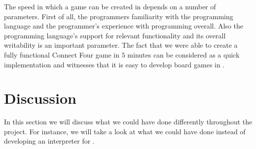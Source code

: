 The speed in which a game can be created in \productname{} depends on a number
of parameters. First of all, the programmers familiarity with the programming
language and the programmer's experience with programming overall. Also the
programming language's support for relevant functionality and its overall
writability is an important parameter. The fact that we were able to create a
fully functional Connect Four game in $5$ minutes can be considered as a quick
implementation and witnesses that it is easy to develop board games in
\productname{}.

\section{Discussion}
\label{sec:discussion}

In this section we will discuss what we could have done differently throughout
the project. For instance, we will take a look at what we could have done
instead of developing an interpreter for \productname{}.








